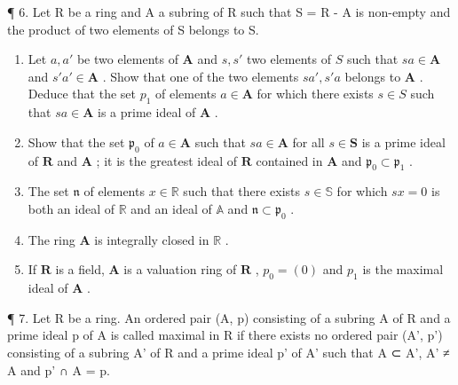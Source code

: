¶ 6. Let R be a ring and A a subring of R such that S = R - A is non-empty and the product of two elements of S belongs to S.

\begin{enumerate}
\def\labelenumi{(\alph{enumi})}
\item
  Let \(a, a'\) be two elements of \(\mathbf{A}\) and \(s, s'\) two elements of \(S\) such that \(sa \in \mathbf{A}\) and \(s'a' \in \mathbf{A}\) . Show that one of the two elements \(sa', s'a\) belongs to \(\mathbf{A}\) . Deduce that the set \(p_1\) of elements \(a \in \mathbf{A}\) for which there exists \(s \in S\) such that \(sa \in \mathbf{A}\) is a prime ideal of \(\mathbf{A}\) .
\item
  Show that the set \(\mathfrak{p}_0\) of \(a \in \mathbf{A}\) such that \(sa \in \mathbf{A}\) for all \(s \in \mathbf{S}\) is a prime ideal of \(\mathbf{R}\) and \(\mathbf{A}\) ; it is the greatest ideal of \(\mathbf{R}\) contained in \(\mathbf{A}\) and \(\mathfrak{p}_0 \subset \mathfrak{p}_1\) .
\item
  The set \(\mathfrak{n}\) of elements \(x \in \mathbb{R}\) such that there exists \(s \in \mathbb{S}\) for which \(sx = 0\) is both an ideal of \(\mathbb{R}\) and an ideal of \(\mathbb{A}\) and \(\mathfrak{n} \subset \mathfrak{p}_0\) .
\item
  The ring \(\mathbf{A}\) is integrally closed in \(\mathbb{R}\) .
\item
  If \(\mathbf{R}\) is a field, \(\mathbf{A}\) is a valuation ring of \(\mathbf{R}\) , \(p_0 = (0)\) and \(p_1\) is the maximal ideal of \(\mathbf{A}\) .
\end{enumerate}

¶ 7. Let R be a ring. An ordered pair (A, p) consisting of a subring A of R and a prime ideal p of A is called maximal in R if there exists no ordered pair (A', p') consisting of a subring A' of R and a prime ideal p' of A' such that A ⊂ A', A' ≠ A and p' ∩ A = p.


